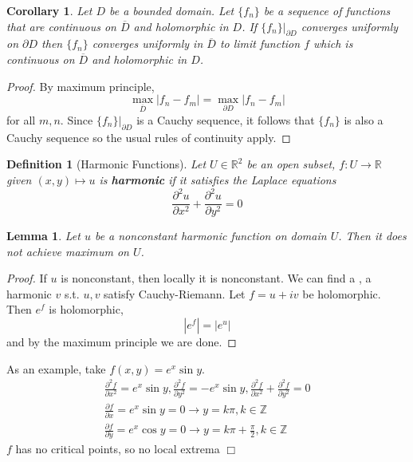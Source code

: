 \documentclass{article}
\newtheorem{definition}{Definition}
\newtheorem{lemma}[theorem]{Lemma}
\newtheorem{corollary}[theorem]{Corollary}
\begin{document}
\begin{corollary}
Let $D$ be a bounded domain. Let $\{f_n\}$ be a sequence of functions that are continuous on $\overline{D}$ and holomorphic in $D$. If $\{f_n\}\big\vert_{\partial D}$ converges uniformly on $\partial D$ then $\{f_n\}$ converges uniformly in $\overline{D}$ to limit function $f$ which is continuous on $\overline{D}$ and holomorphic in $D$.
\end{corollary}
\begin{proof}
By maximum principle,
$$\max_{\overline{D}}|f_n - f_m| = \max_{\partial D} |f_n - f_m|$$
for all $m,n$. Since $\{f_n\}\big\vert_{\partial D}$ is a Cauchy sequence, it follows that $\{f_n\}$ is also a Cauchy sequence so the usual rules of continuity apply.
\end{proof}

\begin{definition}[Harmonic Functions]
Let $U \in \mathbb{R}^2$ be an open subset, $f : U \to \mathbb{R}$ given $(x,y) \mapsto u$ is \textbf{harmonic} if it satisfies the Laplace equations
$$\frac{\partial^2 u}{\partial x^2} + \frac{\partial^2 u}{\partial y^2} = 0$$
\end{definition}

\begin{lemma}
Let $u$ be a nonconstant harmonic function on domain $U$. Then it does not achieve maximum on $U$.
\end{lemma}
\begin{proof}
If $u$ is nonconstant, then locally it is nonconstant. We can find a , a harmonic $v$ s.t. $u,v$ satisfy Cauchy-Riemann. Let $f = u + iv$ be holomorphic. Then $e^f$ is holomorphic,
$$|e^f| = |e^u|$$
and by the maximum principle we are done.
\end{proof}

As an example, take $f(x,y) = e^x \sin y$.
\begin{gather*}
\frac{\partial^2 f}{\partial x^2} = e^x \sin y, \frac{\partial^2 f}{\partial y^2} = - e^x \sin y, \frac{\partial^2 f}{\partial x^2} + \frac{\partial^2 f}{\partial y^2} = 0\\
\frac{\partial f}{\partial x} = e^x \sin y = 0 \to y = k\pi, k \in \mathbb{Z}\\
\frac{\partial f}{\partial y} = e^x \cos y = 0 \to y = k\pi + \frac{\pi}{2}, k \in \mathbb{Z}
\end{gather*}
$f$ has no critical points, so no local extrema $\Box$
\end{document}
